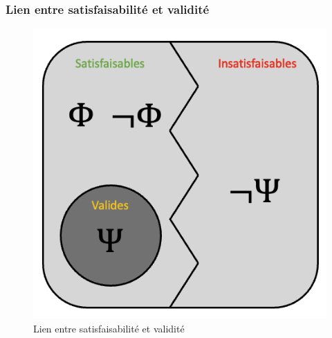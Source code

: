 \documentclass{rapportULB}
\begin{document}
\subsubsection{Lien entre satisfaisabilité et validité}
\begin{figure}[H]
  \centering
  \includegraphics[scale=0.5]{pictures/satisf:vali.png}
  \caption{Lien entre satisfaisabilité et validité}
\end{figure}
\end{document}
